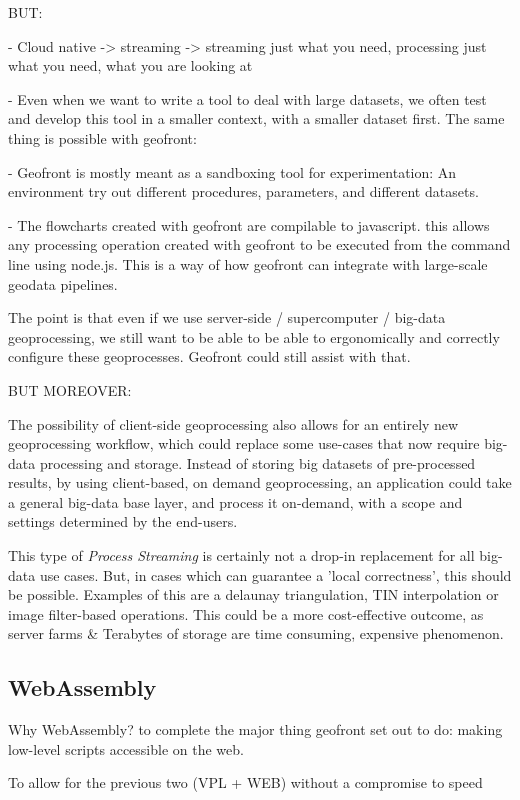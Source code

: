 BUT: 

- Cloud native -> streaming -> streaming just what you need, processing just what you need, what you are looking at

- Even when we want to write a tool to deal with large datasets, we often test and develop this tool in a smaller context, with a smaller dataset first. The same thing is possible with geofront: 

- Geofront is mostly meant as a sandboxing tool for experimentation: An environment try out different procedures, parameters, and different datasets. 

- The flowcharts created with geofront are compilable to javascript. this allows any processing operation created with geofront to be executed from the command line using node.js. This is a way of how geofront can integrate with large-scale geodata pipelines. 

The point is that even if we use server-side / supercomputer / big-data geoprocessing, we still want to be able to be able to ergonomically and correctly configure these geoprocesses. Geofront could still assist with that.

BUT MOREOVER:

The possibility of client-side geoprocessing also allows for an entirely new geoprocessing workflow, which could replace some use-cases that now require big-data processing and storage. Instead of storing big datasets of pre-processed results, by using client-based, on demand geoprocessing, an application could take a general big-data base layer, and process it on-demand, with a scope and settings determined by the end-users. 

This type of \emph{Process Streaming} is certainly not a drop-in replacement for all big-data use cases. But, in cases which can guarantee a 'local correctness', this should be possible. Examples of this are a delaunay triangulation, TIN interpolation or image filter-based operations. This could be a more cost-effective outcome, as server farms \& Terabytes of storage are time consuming, expensive phenomenon.

\subsection{WebAssembly}

Why WebAssembly? to complete the major thing geofront set out to do: making low-level scripts accessible on the web. 

To allow for the previous two (VPL + WEB) without a compromise to speed

